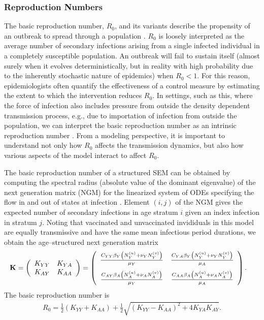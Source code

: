 \subsubsection{Reproduction Numbers}
The basic reproduction number, $ R_0 $, and its variants describe the propensity of an outbreak to spread through a population \cite{heffernan2005perspectives,van2008further}. $ R_0 $ is loosely interpreted as the average number of secondary infections arising from a single infected individual in a completely susceptible population. An outbreak will fail to sustain itself (almost surely when it evolves deterministically, but in reality with high probability due to the inherently stochastic nature of epidemics) when $ R_0 < 1 $. For this reason, epidemiologists often quantify the effectiveness of a control measure by estimating the extent to which the intervention reduces $ R_0 $. In settings, such as this, where the force of infection also includes pressure from outside the density dependent transmission process, e.g., due to importation of infection from outside the population, we can interpret the basic reproduction number as an intrinsic reproduction number \cite{blackwood2018introduction}. From a modeling perspective, it is important to understand not only how $ R_0 $ affects the transmission dynamics, but also how various aspects of the model interact to affect $ R_0 $. 

The basic reproduction number of a structured SEM can be obtained by computing the spectral radius (absolute value of the dominant eigenvalue) of the next generation matrix (NGM) for the linearized system of ODEs specifying the flow in and out of states at infection \cite{heffernan2005perspectives,van2017reproduction,van2008further}. Element $ (i,j) $ of the NGM gives the expected number of secondary infections in age stratum $ i $ given an index infection in stratum $ j $. Noting that vaccinated and unvaccinated invididuals in this model are equally transmissive and have the same mean infectious period durations, we obtain the age--structured next generation matrix
\begin{align}
\label{eqn:sirs_ngm_full}
\mathbf{K} &= 
	\left (
	\begin{array}{cc}
	K_{YY} & K_{YA} \\
	K_{AY} & K_{AA}
	\end{array}
	\right ) =\left (
	\begin{array}{cc}
	\frac{C_{YY}\beta_Y\left (N_Y^{(u)} + \nu_YN_Y^{(v)}\right )}{\mu_Y} & \frac{C_{YA}\beta_Y\left (N_Y^{(u)} + \nu_YN_Y^{(v)}\right )}{\mu_A} \\[2ex]
	\frac{C_{AY}\beta_A\left (N_A^{(u)} + \nu_AN_A^{(v)}\right )}{\mu_Y} & \frac{C_{AA}\beta_A\left (N_A^{(u)} + \nu_AN_A^{(v)}\right )}{\mu_A}
	\end{array}
	\right ).
\end{align}
The basic reproduction number is 
\begin{align}
\label{eqn:sirs_R0}
R_0 = \frac{1}{2}\left (K_{YY} + K_{AA}\right ) + \frac{1}{2}\sqrt{(K_{YY} - K_{AA})^2 + 4K_{YA}K_{AY}}.
\end{align}

